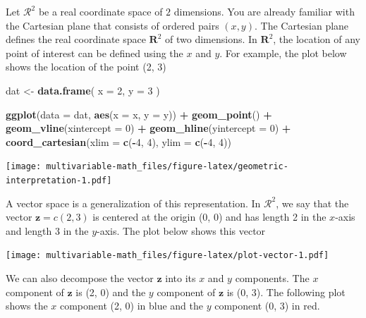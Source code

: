 \documentclass[
]{book}
\newenvironment{Shaded}{\begin{snugshade}}{\end{snugshade}}
\newcommand{\DataTypeTok}[1]{\textcolor[rgb]{0.13,0.29,0.53}{#1}}
\newcommand{\DecValTok}[1]{\textcolor[rgb]{0.00,0.00,0.81}{#1}}
\newcommand{\KeywordTok}[1]{\textcolor[rgb]{0.13,0.29,0.53}{\textbf{#1}}}
\newcommand{\NormalTok}[1]{#1}
\newcommand{\OperatorTok}[1]{\textcolor[rgb]{0.81,0.36,0.00}{\textbf{#1}}}
\newcommand{\StringTok}[1]{\textcolor[rgb]{0.31,0.60,0.02}{#1}}
\theoremstyle{definition}
\theoremstyle{definition}
\theoremstyle{definition}
\theoremstyle{definition}
\theoremstyle{remark}
\begin{document}
Let \(\mathcal{R}^2\) be a real coordinate space of \(2\) dimensions. You are already familiar with the Cartesian plane that consists of ordered pairs \((x, y)\). The Cartesian plane defines the real coordinate space \(\mathbf{R}^2\) of two dimensions. In \(\mathbf{R}^2\), the location of any point of interest can be defined using the \(x\) and \(y\). For example, the plot below shows the location of the point (2, 3)

\begin{Shaded}
\begin{Highlighting}[]
\NormalTok{dat <-}\StringTok{ }\KeywordTok{data.frame}\NormalTok{(}
    \DataTypeTok{x =} \DecValTok{2}\NormalTok{,}
    \DataTypeTok{y =} \DecValTok{3}
\NormalTok{)}

\KeywordTok{ggplot}\NormalTok{(}\DataTypeTok{data =}\NormalTok{ dat, }\KeywordTok{aes}\NormalTok{(}\DataTypeTok{x =}\NormalTok{ x, }\DataTypeTok{y =}\NormalTok{ y)) }\OperatorTok{+}
\StringTok{    }\KeywordTok{geom_point}\NormalTok{() }\OperatorTok{+}
\StringTok{    }\KeywordTok{geom_vline}\NormalTok{(}\DataTypeTok{xintercept =} \DecValTok{0}\NormalTok{) }\OperatorTok{+}\StringTok{ }
\StringTok{    }\KeywordTok{geom_hline}\NormalTok{(}\DataTypeTok{yintercept =} \DecValTok{0}\NormalTok{) }\OperatorTok{+}
\StringTok{    }\KeywordTok{coord_cartesian}\NormalTok{(}\DataTypeTok{xlim =} \KeywordTok{c}\NormalTok{(}\OperatorTok{-}\DecValTok{4}\NormalTok{, }\DecValTok{4}\NormalTok{), }\DataTypeTok{ylim =} \KeywordTok{c}\NormalTok{(}\OperatorTok{-}\DecValTok{4}\NormalTok{, }\DecValTok{4}\NormalTok{))}
\end{Highlighting}
\end{Shaded}

\texttt{[image: multivariable-math\_files/figure-latex/geometric-interpretation-1.pdf]}

A vector space is a generalization of this representation. In \(\mathcal{R}^2\), we say that the vector \(\mathbf{z} = c(2, 3)\) is centered at the origin (0, 0) and has length 2 in the \(x\)-axis and length 3 in the \(y\)-axis. The plot below shows this vector

\texttt{[image: multivariable-math\_files/figure-latex/plot-vector-1.pdf]}

We can also decompose the vector \(\mathbf{z}\) into its \(x\) and \(y\) components. The \(x\) component of \(\mathbf{z}\) is (2, 0) and the \(y\) component of \(\mathbf{z}\) is (0, 3). The following plot shows the \(x\) component (2, 0) in blue and the \(y\) component (0, 3) in red.
\end{document}
